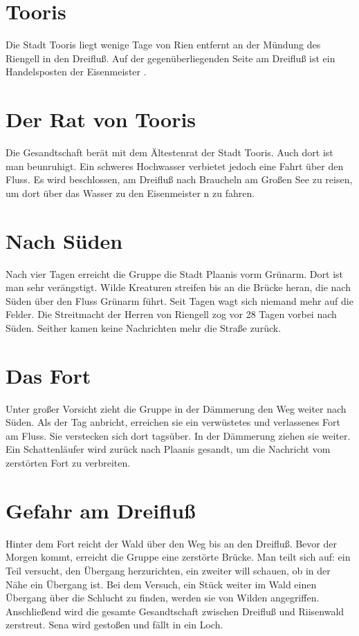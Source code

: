 \documentclass[12pt,a4paper,onecolumn,twoside,ngerman]{book}
\newcommand{\Sena}{Sena}
\newcommand{\Schattenlaufer}{Schattenläufer}
\newcommand{\Rhingell}{Riengell}
\newcommand{\Rhin}{Rien}
\newcommand{\Dreifluss}{Dreifluß}
\newcommand{\Toris}{Tooris}
\newcommand{\Planis}{Plaanis}
\newcommand{\Grunarm}{Grünarm}
\newcommand{\Grunland}{Grünland}
\newcommand{\Braucheln}{Braucheln}
\newcommand{\Riesenwald}{Riisenwald}
\newcommand{\Eisenmeister}{Eisenmeister}
\begin{document}
\section{\Toris}
Die Stadt {\Toris} liegt wenige Tage von {\Rhin} entfernt an der Mündung des {\Rhingell} in den {\Dreifluss}. Auf der gegenüberliegenden Seite am {\Dreifluss} ist ein Handelsposten der {\Eisenmeister} .

\section{Der Rat von \Toris}
Die Gesandtschaft berät mit dem Ältestenrat der Stadt {\Toris}. Auch dort ist man beunruhigt. Ein schweres Hochwasser verbietet jedoch eine Fahrt über den Fluss. Es wird beschlossen, am {\Dreifluss} nach {\Braucheln} am Großen See zu reisen, um dort über das Wasser zu den {\Eisenmeister} n zu fahren.

\section{Nach Süden}
Nach vier Tagen erreicht die Gruppe die Stadt {\Planis} vorm {\Grunarm}. Dort ist man sehr verängstigt. Wilde Kreaturen streifen bis an die Brücke heran, die nach Süden über den Fluss {\Grunarm} führt. Seit Tagen wagt sich niemand mehr auf die Felder. Die Streitmacht der Herren von {\Rhingell} zog vor 28 Tagen vorbei nach Süden. Seither kamen keine Nachrichten mehr die Straße zurück.
 
\section{Das Fort}
Unter großer Vorsicht zieht die Gruppe in der Dämmerung den Weg weiter nach Süden.\linebreak
Als der Tag anbricht, erreichen sie ein verwüstetes und verlassenes Fort am Fluss. Sie verstecken sich dort tagsüber. In der Dämmerung ziehen sie weiter. Ein  {\Schattenlaufer} wird zurück nach {\Planis} gesandt, um die Nachricht vom zerstörten Fort zu verbreiten.

\section{Gefahr am \Dreifluss}
Hinter dem Fort reicht der Wald über den Weg bis an den {\Dreifluss}. Bevor der Morgen kommt, erreicht die Gruppe eine zerstörte Brücke.\linebreak
Man teilt sich auf: ein Teil versucht, den Übergang herzurichten, ein zweiter will schauen, ob in der Nähe ein Übergang ist. Bei dem Versuch, ein Stück weiter im Wald einen Übergang über die Schlucht zu finden, werden sie von Wilden angegriffen. Anschließend wird die gesamte Gesandtschaft zwischen {\Dreifluss} und {\Riesenwald} zerstreut.  {\Sena} wird gestoßen und fällt in ein Loch.
\end{document}
